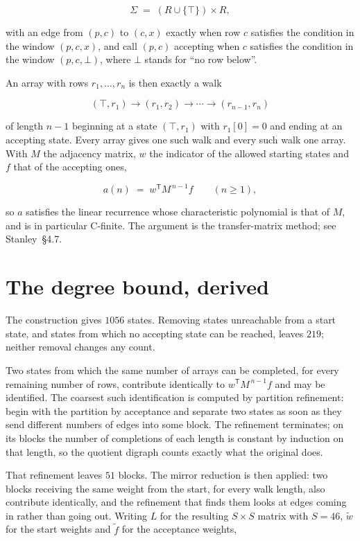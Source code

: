 \documentclass[11pt]{article}
\theoremstyle{definition}
\begin{document}
\[\Sigma \;=\; (R \cup \{\top\}) \times R,\]

with an edge from $(p,c)$ to $(c,x)$ exactly when row $c$ satisfies the condition in the window $(p,c,x)$, and call $(p,c)$ accepting when $c$ satisfies the condition in the window $(p,c,\bot)$, where $\bot$ stands for ``no row below''.

An array with rows $r_1,\dots,r_n$ is then exactly a walk

\[(\top,r_1) \to (r_1,r_2) \to \cdots \to (r_{n-1},r_n)\]

of length $n-1$ beginning at a state $(\top,r_1)$ with $r_1[0]=0$ and ending at an accepting state. Every array gives one such walk and every such walk one array. With $M$ the adjacency matrix, $w$ the indicator of the allowed starting states and $f$ that of the accepting ones,

\[a(n) \;=\; w^{\mathsf T} M^{\,n-1} f \qquad (n \ge 1),\]

so $a$ satisfies the linear recurrence whose characteristic polynomial is that of $M$, and is in particular C-finite. The argument is the transfer-matrix method; see Stanley~\S4.7.

\section{The degree bound, derived}

The construction gives $1056$ states. Removing states unreachable from a start state, and states from which no accepting state can be reached, leaves $219$; neither removal changes any count.

Two states from which the same number of arrays can be completed, for every remaining number of rows, contribute identically to $w^{\mathsf T}M^{\,n-1}f$ and may be identified. The coarsest such identification is computed by partition refinement: begin with the partition by acceptance and separate two states as soon as they send different numbers of edges into some block. The refinement terminates; on its blocks the number of completions of each length is constant by induction on that length, so the quotient digraph counts exactly what the original does.

That refinement leaves $51$ blocks. The mirror reduction is then applied: two blocks receiving the same weight from the start, for every walk length, also contribute identically, and the refinement that finds them looks at edges coming in rather than going out. Writing $L$ for the resulting $S \times S$ matrix with $S = 46$, $\tilde w$ for the start weights and $\tilde f$ for the acceptance weights,
\end{document}
